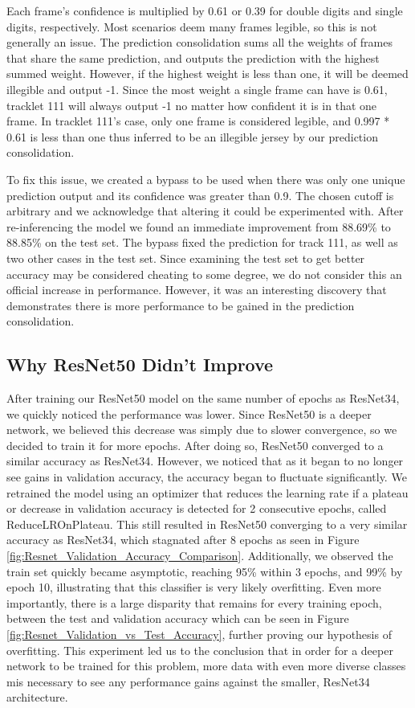 \documentclass[11pt, letterpaper]{article}
\begin{document}
Each frame's confidence is multiplied by 0.61 or 0.39 for double digits and single digits, respectively. Most scenarios deem many frames legible, so this is not generally an issue. The prediction consolidation sums all the weights of frames that share the same prediction, and outputs the prediction with the highest summed weight. However, if the highest weight is less than one, it will be deemed illegible and output -1. Since the most weight a single frame can have is 0.61, tracklet 111 will always output -1 no matter how confident it is in that one frame. In tracklet 111's case, only one frame is considered legible, and 0.997 * 0.61 is less than one thus inferred to be an illegible jersey by our prediction consolidation. 

To fix this issue, we created a bypass to be used when there was only one unique prediction output and its confidence was greater than 0.9. The chosen cutoff is arbitrary and we acknowledge that altering it could be experimented with. After re-inferencing the model we found an immediate improvement from 88.69\% to 88.85\% on the test set. The bypass fixed the prediction for track 111, as well as two other cases in the test set. Since examining the test set to get better accuracy may be considered cheating to some degree, we do not consider this an official increase in performance. However, it was an interesting discovery that demonstrates there is more performance to be gained in the prediction consolidation.

\subsection{Why ResNet50 Didn't Improve}

After training our ResNet50 model on the same number of epochs as ResNet34, we quickly noticed the performance was lower. Since ResNet50 is a deeper network, we believed this decrease was simply due to slower convergence, so we decided to train it for more epochs. After doing so, ResNet50 converged to a similar accuracy as ResNet34. However, we noticed that as it began to no longer see gains in validation accuracy, the accuracy began to fluctuate significantly. We retrained the model using an optimizer that reduces the learning rate if a plateau or decrease in validation accuracy is detected for 2 consecutive epochs, called ReduceLROnPlateau. This still resulted in ResNet50 converging to a very similar accuracy as ResNet34, which stagnated after 8 epochs as seen in Figure \ref{fig:Resnet_Validation_Accuracy_Comparison}. Additionally, we observed the train set quickly became asymptotic, reaching 95\% within 3 epochs, and 99\% by epoch 10, illustrating that this classifier is very likely overfitting. Even more importantly, there is a large disparity that remains for every training epoch, between the test and validation accuracy which can be seen in Figure \ref{fig:Resnet_Validation_vs_Test_Accuracy}, further proving our hypothesis of overfitting. This experiment led us to the conclusion that in order for a deeper network to be trained for this problem, more data with even more diverse classes mis necessary to see any performance gains against the smaller, ResNet34 architecture.
\end{document}
